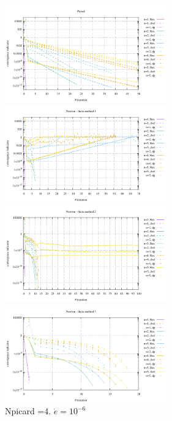 \begin{center}
\includegraphics[width=7cm]{python_codes/fieldstone_87/results/experiment_01/conv_picard.pdf}
\includegraphics[width=7cm]{python_codes/fieldstone_87/results/experiment_01/conv_meth1.pdf}\\
\includegraphics[width=7cm]{python_codes/fieldstone_87/results/experiment_01/conv_meth2.pdf}
\includegraphics[width=7cm]{python_codes/fieldstone_87/results/experiment_01/conv_meth3.pdf}\\
{\captionfont Npicard =4. $\dot{e}=10^{-6}$}
\end{center}


